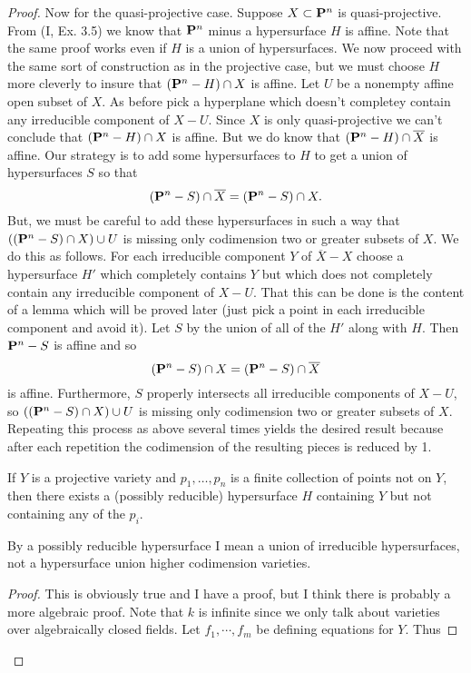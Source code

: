 \documentclass[12pt]{article}
\begin{document}
\begin{proof}
Now for the quasi-projective case. Suppose $X\subset\P^n$ is 
quasi-projective. From (I, Ex. 3.5) we know that $\P^n$ minus
a hypersurface $H$ is affine. Note that the same proof
works even if $H$ is a union of hypersurfaces. We now
proceed with the same sort of construction as in the projective
case, but we must choose $H$ more cleverly to insure
that $(\P^n-H)\intersect{}X$ is affine. Let $U$ be a nonempty  
affine open subset of $X$. As before pick a hyperplane which 
doesn't completey contain any irreducible component of $X-U$.
Since $X$ is only quasi-projective we can't conclude that
$(\P^n-H)\intersect{}X$ is affine. But we do know that
$(\P^n-H)\intersect{}\overline{X}$ is affine. Our strategy is
to add some hypersurfaces to $H$ to get a union of hypersurfaces $S$ so that 
$$(\P^n-S)\intersect{}\overline{X}=(\P^n-S)\intersect{}X.$$
But, we must be careful to add these hypersurfaces in such a
way that $((\P^n-S)\intersect{}X)\union U$ is missing only codimension
two or greater subsets of $X$. We do this as follows. For each
irreducible component $Y$ of $\overline{X}-X$ choose a hypersurface
$H'$ which completely contains $Y$ but which does not completely
contain any irreducible component of $X-U$. That this can be done
is the content of a lemma which will be proved later (just pick a point
in each irreducible component and avoid it). Let $S$
by the union of all of the $H'$ along with $H$. Then 
$\P^n-S$ is affine and so
$$(\P^n-S)\intersect{}X=(\P^n-S)\intersect{}\overline{X}$$
is affine. Furthermore, $S$ properly intersects all
irreducible components of $X-U$, so 
$((\P^n-S)\intersect{}X)\union U$ is missing only codimension
two or greater subsets of $X$. Repeating this process
as above several times yields the desired result because
after each repetition the codimension of the resulting
pieces is reduced by 1.  
\begin{lem}
If $Y$ is a projective variety and $p_1,\ldots,p_n$ is a finite
collection of points not on $Y$, 
then there exists a (possibly reducible) hypersurface $H$ containing
$Y$ but not containing any of the $p_i$. 
\end{lem}
By a possibly reducible hypersurface I mean a union of irreducible
hypersurfaces, not a hypersurface union higher codimension varieties. 
\begin{proof}
This is obviously true and I have a proof, but I think there
is probably a more algebraic proof. Note that $k$ is infinite
since we only talk about varieties over algebraically closed fields.  
Let $f_1,\cdots,f_m$ be defining equations for $Y$. Thus

\end{proof}
\end{proof}
\end{document}
